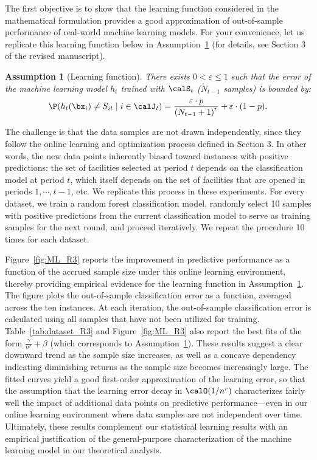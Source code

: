 \documentclass[11pt]{article}
\newtheorem{assumption}{Assumption}[]
\begin{document}
The first objective is to show that the learning function considered in the mathematical formulation provides a good approximation of out-of-sample performance of real-world machine learning models. For your convenience, let us replicate this learning function below in Assumption~\ref{ass:classification_R3_4} (for details, see Section 3 of the revised manuscript).
\setcounter{assumption}{3} 
\begin{assumption}[Learning function] \label{ass:classification_R3_4}
    There exists $0<\varepsilon\leq 1$ such that the error of the machine learning model $h_t$ trained with $\calS_t$ ($N_{t-1}$ samples) is bounded by:
    \begin{align*}
        \P(h_t(\bx_{i})\neq S_{it} \mid i \in \calJ_t)=\frac{\varepsilon\cdot p}{\left(N_{t-1} + 1\right)^r}+\varepsilon\cdot(1-p).
    \end{align*}
\end{assumption}

The challenge is that the data samples are not drawn independently, since they follow the online learning and optimization process defined in Section 3. In other words, the new data points inherently biased toward instances with positive predictions: the set of facilities selected at period $t$ depends on the classification model at period $t$, which itself depends on the set of facilities that are opened in periods $1,\cdots,t-1$, etc. We replicate this process in these experiments. For every dataset, we train a random forest classification model, randomly select 10 samples with positive predictions from the current classification model to serve as training samples for the next round, and proceed iteratively. We repeat the procedure 10 times for each dataset. 

Figure~\ref{fig:ML_R3} reports the improvement in predictive performance as a function of the accrued sample size under this online learning environment, thereby providing empirical evidence for the learning function in Assumption~\ref{ass:classification_R3_4}. The figure plots the out-of-sample classification error as a function, averaged across the ten instances. At each iteration, the out-of-sample classification error is calculated using all samples that have not been utilized for training. Table~\ref{tab:dataset_R3} and Figure~\ref{fig:ML_R3} also report the best fits of the form $\frac{\gamma}{n^r}+\beta$ (which corresponds to Assumption~\ref{ass:classification_R3_4}). These results suggest a clear downward trend as the sample size increases, as well as a concave dependency indicating diminishing returns as the sample size becomes increasingly large. The fitted curves yield a good first-order approximation of the learning error, so that the assumption that the learning error decay in $\calO(1/n^r)$ characterizes fairly well the impact of additional data points on predictive performance---even in our online learning environment where data samples are not independent over time. Ultimately, these results complement our statistical learning results with an empirical justification of the general-purpose characterization of the machine learning model in our theoretical analysis.
\end{document}
